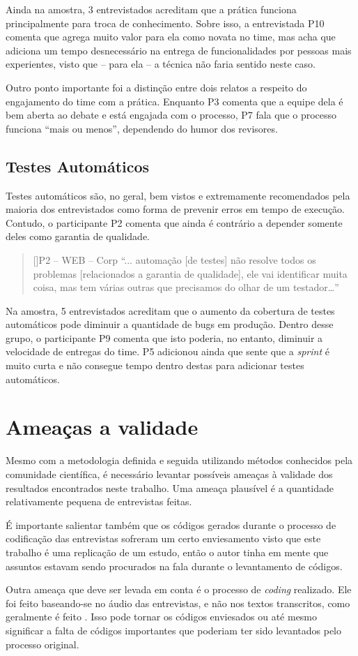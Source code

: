 Ainda na amostra, 3 entrevistados acreditam que a prática funciona principalmente para troca de conhecimento. Sobre isso, a entrevistada P10 comenta que agrega muito valor para ela como novata no time, mas acha que adiciona um tempo desnecessário na entrega de funcionalidades por pessoas mais experientes, visto que -- para ela -- a técnica não faria sentido neste caso.

Outro ponto importante foi a distinção entre dois relatos a respeito do engajamento do time com a prática. Enquanto P3 comenta que a equipe dela é bem aberta ao debate e está engajada com o processo, P7 fala que o processo funciona ``mais ou menos'', dependendo do humor dos revisores.

\subsection{Testes Automáticos}

Testes automáticos são, no geral, bem vistos e extremamente recomendados pela maioria dos entrevistados como forma de prevenir erros em tempo de execução. Contudo, o participante P2 comenta que ainda é contrário a depender somente deles como garantia de qualidade.

\begin{quotation}[]{P2 -- WEB -- Corp}
    ``... automação [de testes] não resolve todos os problemas [relacionados a garantia de qualidade], ele vai identificar muita coisa, mas tem várias outras que precisamos do olhar de um testador…''
\end{quotation}

Na amostra, 5 entrevistados acreditam que o aumento da cobertura de testes automáticos pode diminuir a quantidade de bugs em produção. Dentro desse grupo, o participante P9 comenta que isto poderia, no entanto, diminuir a velocidade de entregas do time. P5 adicionou ainda que sente que a \emph{sprint} é muito curta e não consegue tempo dentro destas para adicionar testes automáticos.

\section{Ameaças a validade}

Mesmo com a metodologia definida e seguida utilizando métodos conhecidos pela comunidade científica, é necessário levantar possíveis ameaças à validade dos resultados encontrados neste trabalho. Uma ameaça plausível é a quantidade relativamente pequena de entrevistas feitas.

É importante salientar também que os códigos gerados durante o processo de codificação das entrevistas sofreram um certo enviesamento visto que este trabalho é uma replicação de um estudo, então o autor tinha em mente que assuntos estavam sendo procurados na fala durante o levantamento de códigos. 

Outra ameaça que deve ser levada em conta é o processo de \emph{coding} realizado. Ele foi feito baseando-se no áudio das entrevistas, e não nos textos transcritos, como geralmente é feito \cite{groundedTheory}. Isso pode tornar os códigos enviesados ou até mesmo significar a falta de códigos importantes que poderiam ter sido levantados pelo processo original.
